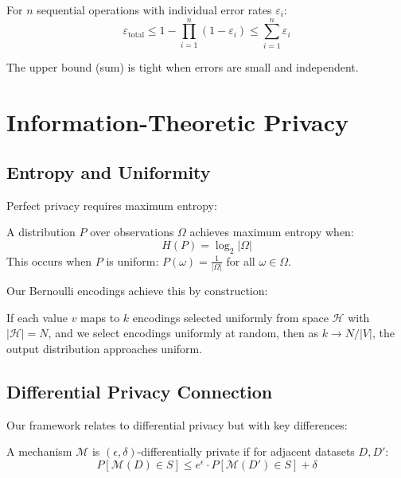\begin{theorem}
For $n$ sequential operations with individual error rates $\varepsilon_i$:
$$\varepsilon_{\text{total}} \leq 1 - \prod_{i=1}^{n}(1 - \varepsilon_i) \leq \sum_{i=1}^{n} \varepsilon_i$$
\end{theorem}

The upper bound (sum) is tight when errors are small and independent.

\section{Information-Theoretic Privacy}

\subsection{Entropy and Uniformity}

Perfect privacy requires maximum entropy:

\begin{definition}
A distribution $P$ over observations $\Omega$ achieves maximum entropy when:
$$H(P) = \log_2 |\Omega|$$
This occurs when $P$ is uniform: $P(\omega) = \frac{1}{|\Omega|}$ for all $\omega \in \Omega$.
\end{definition}

Our Bernoulli encodings achieve this by construction:

\begin{theorem}
If each value $v$ maps to $k$ encodings selected uniformly from space $\mathcal{H}$ with $|\mathcal{H}| = N$, and we select encodings uniformly at random, then as $k \to N/|V|$, the output distribution approaches uniform.
\end{theorem}

\subsection{Differential Privacy Connection}

Our framework relates to differential privacy but with key differences:

\begin{definition}
A mechanism $\mathcal{M}$ is $(\epsilon, \delta)$-differentially private if for adjacent datasets $D, D'$:
$$P[\mathcal{M}(D) \in S] \leq e^\epsilon \cdot P[\mathcal{M}(D') \in S] + \delta$$
\end{definition}

